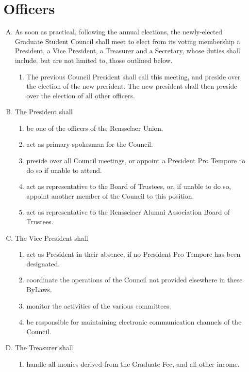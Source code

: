 \documentclass[letterpaper,12pt]{article}
\begin{document}
\section{Officers}
\begin{enumerate} [A.]
	\item As soon as practical, following the annual elections, the newly-­elected Graduate Student Council shall meet to elect from its voting membership a President, a Vice President, a Treasurer and a Secretary, whose duties shall include, but are not limited to, those outlined below.
	\begin{enumerate}[1.]
		\item  The previous Council President shall call this meeting, and preside over the election of the new president. The new president shall then preside over the election of all other officers.
	\end{enumerate}
	\item The President shall
	\begin{enumerate}[1.]
		\item be one of the officers of the Rensselaer Union.
		\item act as primary spokesman for the Council.
		\item preside over all Council meetings, or appoint a President Pro Tempore to do so if unable to attend.
		\item act as representative to the Board of Trustees, or, if unable to do so, appoint another member of the Council to this position.
		\item act as representative to the Rensselaer Alumni Association Board of Trustees.
	\end{enumerate}
	\item The Vice President shall
	\begin{enumerate}[1.]
		\item act as President in their absence, if no President Pro Tempore has been designated.
		\item coordinate the operations of the Council not provided elsewhere in these By­Laws.
	\item monitor the activities of the various committees.
	\item be responsible for maintaining electronic communication channels of the Council.
	\end{enumerate}
	\item The Treasurer shall
	\begin{enumerate}[1.]
		\item handle all monies derived from the Graduate Fee, and all other income.

\end{enumerate}
\end{enumerate}
\end{document}
